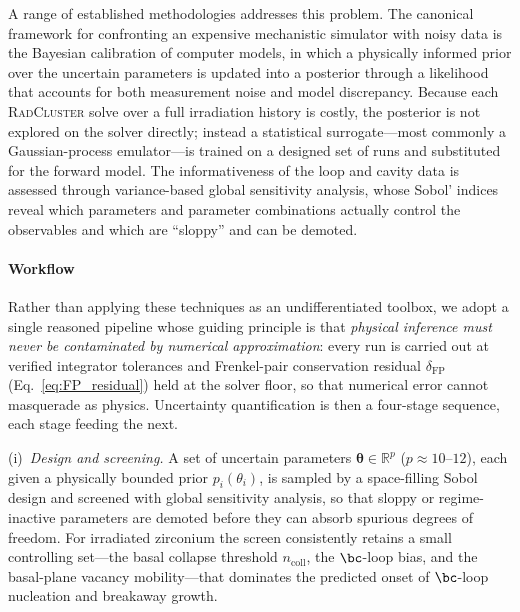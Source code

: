 A range of established methodologies addresses this problem. The canonical
framework for confronting an expensive mechanistic simulator with noisy
data is the Bayesian calibration of computer models, in which a physically
informed prior over the uncertain parameters is updated into a posterior
through a likelihood that accounts for both measurement noise and model
discrepancy. Because each \textsc{RadCluster} solve over a full irradiation
history is costly, the posterior is not explored on the solver directly;
instead a statistical surrogate---most commonly a Gaussian-process
emulator---is trained on a designed set of runs and substituted for the
forward model. The informativeness of the loop and cavity data is assessed
through variance-based global sensitivity analysis, whose Sobol' indices
reveal which parameters and parameter combinations actually control the
observables and which are ``sloppy'' and can be demoted.

\paragraph{Workflow}
Rather than applying these techniques as an undifferentiated toolbox, we
adopt a single reasoned pipeline whose guiding principle is that
\emph{physical inference must never be contaminated by numerical
approximation}: every run is carried out at verified integrator tolerances
and Frenkel-pair conservation residual $\delta_{\mathrm{FP}}$
(Eq.~\eqref{eq:FP_residual}) held at the solver floor, so that numerical
error cannot masquerade as physics. Uncertainty quantification is then a
four-stage sequence, each stage feeding the next.

(i)~\emph{Design and screening.} A set of uncertain parameters
$\boldsymbol{\theta}\in\mathbb{R}^{p}$ ($p\approx10$--$12$), each given a
physically bounded prior $p_i(\theta_i)$, is sampled by a space-filling
Sobol design and screened with global sensitivity analysis, so that sloppy
or regime-inactive parameters are demoted before they can absorb spurious
degrees of freedom. For irradiated zirconium the screen consistently
retains a small controlling set---the basal collapse threshold
$n_{\mathrm{coll}}$, the $\bc$-loop bias, and the basal-plane vacancy
mobility---that dominates the predicted onset of $\bc$-loop nucleation and
breakaway growth.

